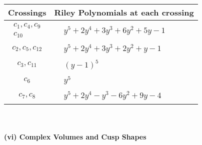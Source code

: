 \documentclass[1p]{elsarticle_modified}
\theoremstyle{definition}
\begin{document}
\begin{tabular}{m{50pt}|m{274pt}}
Crossings & \hspace{64pt}Riley Polynomials at each crossing \\
\hline $$\begin{aligned}c_{1},c_{4},c_{9}\\c_{10}\end{aligned}$$&$\begin{aligned}
&y^5+2 y^4+3 y^3+6 y^2+5 y-1
\end{aligned}$\\
\hline $$\begin{aligned}c_{2},c_{5},c_{12}\end{aligned}$$&$\begin{aligned}
&y^5+2 y^4+3 y^3+2 y^2+y-1
\end{aligned}$\\
\hline $$\begin{aligned}c_{3},c_{11}\end{aligned}$$&$\begin{aligned}
&(y-1)^5
\end{aligned}$\\
\hline $$\begin{aligned}c_{6}\end{aligned}$$&$\begin{aligned}
&y^5
\end{aligned}$\\
\hline $$\begin{aligned}c_{7},c_{8}\end{aligned}$$&$\begin{aligned}
&y^5+2 y^4- y^3-6 y^2+9 y-4
\end{aligned}$\\
\hline
\end{tabular}\\~\\
\newpage\flushleft \textbf{(vi) Complex Volumes and Cusp Shapes}
\end{document}
